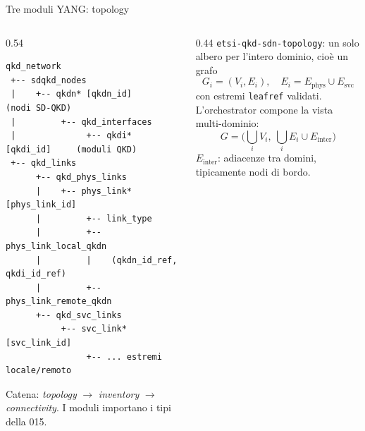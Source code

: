 \documentclass[10pt]{beamer}
\begin{document}
\begin{frame}[fragile]{Tre moduli YANG: topology}
  \begin{columns}[T]
    \begin{column}{0.54\textwidth}
\begin{lstlisting}[basicstyle=\ttfamily\fontsize{5.8}{6.6}\selectfont]
qkd_network
 +-- sdqkd_nodes
 |    +-- qkdn* [qkdn_id]               (nodi SD-QKD)
 |         +-- qkd_interfaces
 |              +-- qkdi* [qkdi_id]     (moduli QKD)
 +-- qkd_links
      +-- qkd_phys_links
      |    +-- phys_link* [phys_link_id]
      |         +-- link_type
      |         +-- phys_link_local_qkdn
      |         |    (qkdn_id_ref, qkdi_id_ref)
      |         +-- phys_link_remote_qkdn
      +-- qkd_svc_links
           +-- svc_link* [svc_link_id]
                +-- ... estremi locale/remoto
\end{lstlisting}
      \footnotesize Catena: \emph{topology} $\to$ \emph{inventory} $\to$
      \emph{connectivity}. I moduli importano i tipi della 015.
    \end{column}
    \begin{column}{0.44\textwidth}
      \small \texttt{etsi-qkd-sdn-topology}: un solo albero per l'intero
      dominio, cioè un grafo
      \[
        G_i = (V_i, E_i),\quad E_i = E_{\text{phys}}\cup E_{\text{svc}}
      \]
      con estremi \texttt{leafref} validati. L'orchestrator compone la vista
      multi-dominio:
      \[
        G = \Big(\bigcup_i V_i,\ \bigcup_i E_i \cup E_{\text{inter}}\Big)
      \]
      \footnotesize $E_{\text{inter}}$: adiacenze tra domini, tipicamente
      nodi di bordo.
    \end{column}
  \end{columns}
\end{frame}
\end{document}
